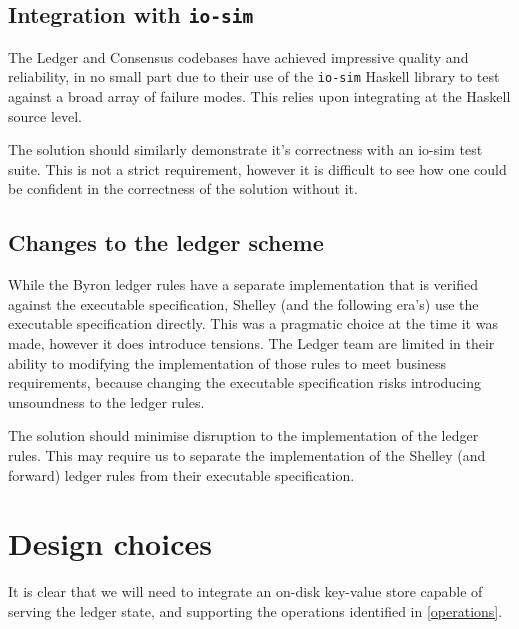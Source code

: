 \documentclass[11pt,a4paper]{article}
\begin{document}
\subsection{Integration with {\tt io-sim}}
\label{io-sim}
The Ledger and Consensus codebases have achieved impressive quality
and reliability, in no small part due to their use of the {\tt io-sim}
Haskell library to test against a broad array of failure modes. This
relies upon integrating at the Haskell source level.

The solution should similarly demonstrate it's correctness with an io-sim test
suite. This is not a strict requirement, however it is difficult to see how one
could be confident in the correctness of the solution without it.

\subsection{Changes to the ledger scheme}

While the Byron ledger rules have
a separate implementation that is verified against the executable specification,
Shelley (and the following era's) use the executable specification directly.
This was a pragmatic choice at the time it was made, however it does introduce
tensions. The Ledger team are limited in their ability to modifying the
implementation of those rules to meet business requirements, because changing
the executable specification risks introducing unsoundness to the ledger rules.

The solution should minimise disruption to the implementation of the ledger
rules. This may require us to separate the implementation of the Shelley (and
forward) ledger rules from their executable specification.

\section{Design choices}
\label{design-choices}

It is clear that we will need to integrate an on-disk key-value store capable
of serving the ledger state, and supporting the operations identified in
\cref{operations}.
\end{document}
